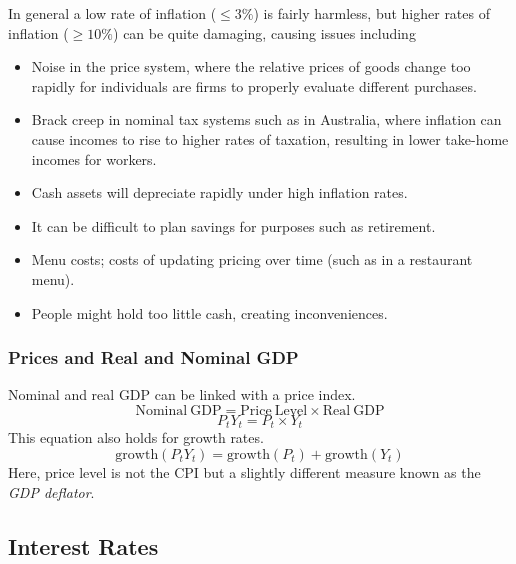 \documentclass[12pt]{report}
\begin{document}
\begin{flushleft}
In general a low rate of inflation (\(\leq 3\%\)) is fairly harmless, but 
higher rates of inflation (\(\geq 10\%\)) can be quite damaging, causing issues
including
\begin{itemize}
    \item Noise in the price system, where the relative prices of goods change
        too rapidly for individuals are firms to properly evaluate different 
        purchases.
    \item Brack creep in nominal tax systems such as in Australia, where 
        inflation can cause incomes to rise to higher rates of taxation, 
        resulting in lower take-home incomes for workers.
    \item Cash assets will depreciate rapidly under high inflation rates.
    \item It can be difficult to plan savings for purposes such as retirement.
    \item Menu costs; costs of updating pricing over time 
    (such as in a restaurant menu).
    \item People might hold too little cash, creating inconveniences.
\end{itemize}

\subsubsection*{Prices and Real and Nominal GDP}
Nominal and real GDP can be linked with a price index.
\[\mathrm{Nominal\:GDP} = \mathrm{Price\:Level}\times\mathrm{Real\:GDP}\]
\[P_tY_t = P_t\times Y_t\]
This equation also holds for growth rates.
\[\mathrm{growth}(P_tY_t) = \mathrm{growth}(P_t) + \mathrm{growth}(Y_t)\]
Here, price level is not the CPI but a slightly different measure known as the
\textit{GDP deflator}.

\subsection*{Interest Rates}


\end{flushleft}
\end{document}
